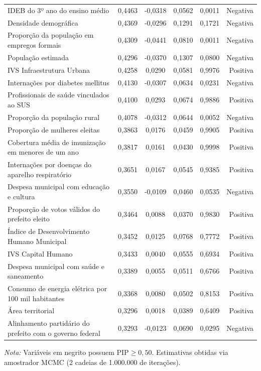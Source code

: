 \begin{table}[htbp]
\begin{tabular}{lccccr}
IDEB do 3º ano do ensino médio & 0,4463 & -0,0318 & 0,0562 & 0,0011 & Negativa \\
Densidade demográfica & 0,4369 & -0,0296 & 0,1291 & 0,1721 & Negativa \\
Proporção da população em empregos formais & 0,4309 & -0,0441 & 0,0810 & 0,0011 & Negativa \\
População estimada & 0,4296 & -0,0370 & 0,1307 & 0,0800 & Negativa \\
IVS Infraestrutura Urbana & 0,4258 & 0,0290 & 0,0581 & 0,9976 & Positiva \\
Internações por diabetes mellitus & 0,4130 & -0,0307 & 0,0634 & 0,0231 & Negativa \\
Profissionais de saúde vinculados ao SUS & 0,4100 & 0,0293 & 0,0674 & 0,9886 & Positiva \\
Proporção da população rural & 0,4078 & -0,0312 & 0,0644 & 0,0052 & Negativa \\
Proporção de mulheres eleitas & 0,3863 & 0,0176 & 0,0459 & 0,9905 & Positiva \\
Cobertura média de imunização em menores de um ano & 0,3817 & 0,0161 & 0,0430 & 0,9998 & Positiva \\
Internações por doenças do aparelho respiratório & 0,3651 & 0,0167 & 0,0545 & 0,9385 & Positiva \\
Despesa municipal com educação e cultura & 0,3550 & -0,0109 & 0,0460 & 0,0535 & Negativa \\
Proporção de votos válidos do prefeito eleito & 0,3464 & 0,0088 & 0,0370 & 0,9830 & Positiva \\
Índice de Desenvolvimento Humano Municipal & 0,3452 & 0,0125 & 0,0768 & 0,7772 & Positiva \\
IVS Capital Humano & 0,3433 & 0,0040 & 0,0555 & 0,6934 & Positiva \\
Despesa municipal com saúde e saneamento & 0,3389 & 0,0055 & 0,0511 & 0,6766 & Positiva \\
Consumo de energia elétrica por 100 mil habitantes & 0,3368 & 0,0080 & 0,0502 & 0,8153 & Positiva \\
Área territorial & 0,3296 & 0,0018 & 0,0389 & 0,6409 & Positiva \\
Alinhamento partidário do prefeito com o governo federal & 0,3293 & -0,0123 & 0,0690 & 0,0295 & Negativa \\
\bottomrule
\end{tabular}
\begin{tablenotes}\footnotesize
\item \textit{Nota:} Variáveis em negrito possuem $\text{PIP} \ge 0{,}50$. Estimativas obtidas via amostrador MCMC (2 cadeias de 1.000.000 de iterações).
\end{tablenotes}
\end{table}